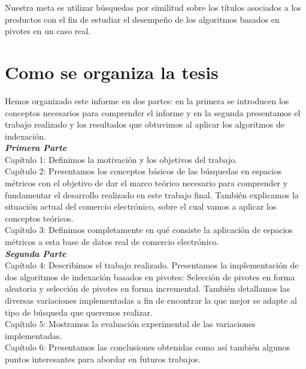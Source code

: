 Nuestra meta es utilizar b\'usquedas por similitud sobre los t\'itulos asociados a los productos con el fin de estudiar el desempeño de los algoritmos basados en pivotes en un caso real. 

\section{Como se organiza la tesis}

Hemos organizado este informe en dos partes: en la primera se introducen los conceptos necesarios para comprender el informe y en la segunda presentamos el trabajo realizado y los resultados que obtuvimos al aplicar los algoritmos de indexaci\'on.\\

\noindent \textbf{\textit{Primera Parte}}\\

\noindent Cap\'itulo 1: Definimos la motivaci\'on y los objetivos del trabajo.\\

\noindent Cap\'itulo 2: Presentamos los conceptos b\'asicos de las b\'usquedas en espacios m\'etricos con el objetivo de dar el marco te\'orico necesario para comprender y fundamentar el desarrollo realizado en este trabajo final. Tambi\'en explicamos la situaci\'on actual del comercio electr\'onico, sobre el cual vamos a aplicar los conceptos te\'oricos.\\

\noindent Cap\'itulo 3: Definimos completamente en qu\'e consiste la aplicaci\'on de espacios m\'etricos a esta base de datos real de comercio electr\'onico.\\

\noindent \textbf{\textit{Segunda Parte}}\\

\noindent Cap\'itulo 4: Describimos el trabajo realizado. Presentamos la implementaci\'on de dos algoritmos de indexaci\'on basados en pivotes: Selecci\'on de pivotes en forma aleatoria y selecci\'on de pivotes en forma incremental. Tambi\'en detallamos las diversas variaciones implementadas a fin de encontrar la que mejor se adapte al tipo de b\'usqueda que queremos realizar.\\

\noindent Cap\'itulo 5: Mostramos la evaluaci\'on experimental de las variaciones implementadas.\\

\noindent Cap\'itulo 6: Presentamos las conclusiones obtenidas como as\'i tambi\'en algunos puntos interesantes para abordar en futuros trabajos.\\

